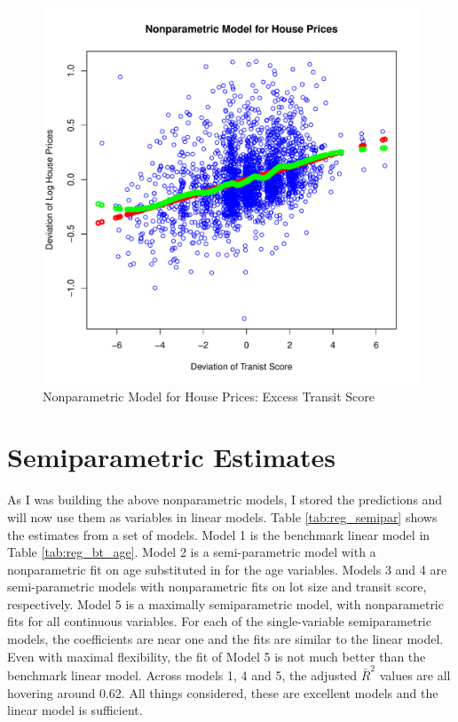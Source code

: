 \begin{figure}[h!]
  \centering
  \includegraphics[scale = 0.5, keepaspectratio=true]{../Figures/dev_np_vs_trans_dev}
  \caption{Nonparametric Model for House Prices: Excess Transit Score} \label{fig:dev_np_vs_trans_dev}
\end{figure}

 

\pagebreak
\section{Semiparametric Estimates}

As I was building the above nonparametric models, 
I stored the predictions and will now use them as variables in 
linear models. 
Table \ref{tab:reg_semipar} 
shows the estimates from a set of models. 
Model 1 is the benchmark linear model in 
Table \ref{tab:reg_bt_age}. 
Model 2 is a semi-parametric model
with a nonparametric fit on age
substituted in for the age variables.
Models 3 and 4 are semi-parametric models
with nonparametric fits on lot size and transit score, respectively.
Model 5 is a maximally semiparametric model, 
with nonparametric fits for all continuous variables. 
For each of the single-variable semiparametric models, 
the coefficients are near one
and the fits are similar to the linear model. 
Even with maximal flexibility, the fit of Model 5
is not much better than the benchmark linear model. 
Across models 1, 4 and 5, the adjusted $\bar{R}^2$ values are all hovering around 0.62. 
All things considered, these are excellent models
and the linear model is sufficient.

